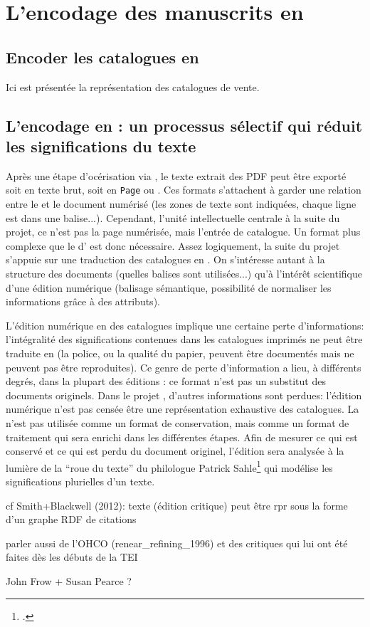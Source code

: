\section{L'encodage des manuscrits en \xmltei{}}
\subsection{Encoder les catalogues en \tei{}}
Ici est présentée la représentation \xmltei{} des catalogues de vente.

\subsection{L'encodage en \tei{}: un processus sélectif qui réduit les significations du texte}
Après une étape d'\gls{océrisation} via \escr{}, le texte extrait des PDF peut être exporté soit en texte brut, soit en \xml{} \texttt{Page} ou \alto{}. Ces formats s'attachent à garder une relation entre le \xml{} et le document numérisé (les zones de texte sont indiquées, chaque ligne est dans une balise...). Cependant, l'unité intellectuelle centrale à la suite du projet, ce n'est pas la page numérisée, mais l'entrée de catalogue. Un format plus complexe que le \xml{} d'\escr{} est donc nécessaire. Assez logiquement, la suite du projet s'appuie sur une traduction des catalogues en \tei{}. On s'intéresse autant à la structure des documents \xml{} (quelles balises sont utilisées...) qu'à l'intérêt scientifique d'une édition numérique (balisage sémantique, possibilité de normaliser les informations grâce à des attributs).

L'édition numérique en \xmltei{} des catalogues implique une certaine perte d'informations: l'intégralité des significations contenues dans les catalogues imprimés ne peut être traduite en \tei{} (la police, ou la qualité du papier, peuvent être documentés mais ne peuvent pas être reproduites). Ce genre de perte d'information a lieu, à différents degrés, dans la plupart des éditions \tei{}: ce format n'est pas un substitut des documents originels. Dans le projet \mssktb{}, d'autres informations sont perdues: l'édition numérique n'est pas censée être une représentation exhaustive des catalogues. La \tei{} n'est pas utilisée comme un format de conservation, mais comme un format de traitement qui sera enrichi dans les différentes étapes. Afin de mesurer ce qui est conservé et ce qui est perdu du document originel, l'édition \tei{} sera analysée à la lumière de la \enquote{roue du texte} du philologue Patrick Sahle\footcite[p. 11]{sahle_digital_2016} qui modélise les significations plurielles d'un texte.

cf Smith+Blackwell (2012): texte (édition critique) peut être rpr sous la forme d'un graphe RDF de citations

parler aussi de l'OHCO (renear\_refining\_1996) et des critiques qui lui ont été faites dès les débuts de la TEI

John Frow + Susan Pearce ?